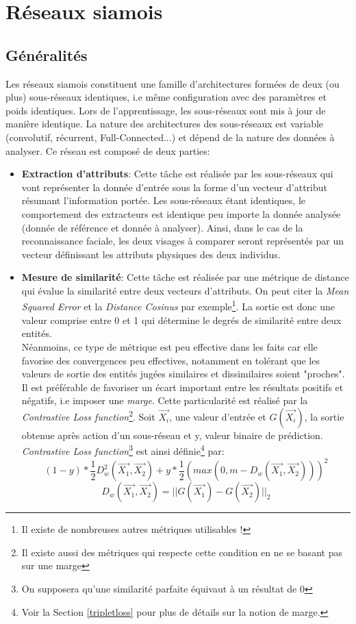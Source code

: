 \section{Réseaux siamois}
\subsection{Généralités}
Les réseaux siamois\cite{siamese} constituent une famille d'architectures formées de deux (ou plus) sous-réseaux identiques, i.e même configuration avec des paramètres et poids identiques. Lors de l'apprentissage, les sous-réseaux sont mis à jour de manière identique. La nature des architectures des sous-réseaux est variable (convolutif, récurrent, Full-Connected...) et dépend de la nature des données à analyser. Ce réseau est composé de deux parties:
\begin{itemize}
    \item \textbf{Extraction d'attributs}: Cette tâche est réalisée par les sous-réseaux qui vont représenter la donnée d'entrée sous la forme d'un vecteur d'attribut résumant l'information portée. Les sous-réseaux étant identiques, le comportement des extracteurs est identique peu importe la donnée analysée (donnée de référence et donnée à analyser). Ainsi, dans le cas de la reconnaissance faciale, les deux visages à comparer seront représentés par un vecteur définissant les attributs physiques des deux individus.
    \item \textbf{Mesure de similarité}: Cette tâche est réalisée par une métrique de distance qui évalue la similarité entre deux vecteurs d'attributs. On peut citer la \textit{Mean Squared Error} et la \textit{Distance Cosinus} par exemple\footnote{Il existe de nombreuses autres métriques utilisables !}. La sortie est donc une valeur comprise entre 0 et 1 qui détermine le degrés de similarité entre deux entités.\\

    Néanmoins, ce type de métrique est peu effective dans les faits car elle favorise des convergences peu effectives, notamment en tolérant que les valeurs de sortie des entités jugées similaires et dissimilaires soient "proches". Il est préférable de favoriser un écart important entre les résultats positifs et négatifs, i.e imposer une \textit{marge}. Cette particularité est réalisé par la \textit{Contrastive Loss function}\cite{contlossfn}\footnote{Il existe aussi des métriques qui respecte cette condition en ne se basant pas sur une marge}. Soit $\vec{X_i}$, une valeur d'entrée et $G(\vec{X_i})$, la sortie obtenue après action d'un sous-réseau et y, valeur binaire de prédiction. \textit{Contrastive Loss function}\footnote{On supposera qu'une similarité parfaite équivaut à un résultat de 0} est ainsi définie\footnote{Voir la Section \ref{tripletloss} pour plus de détails sur la notion de marge.} par:
    $$(1-y)*\frac{1}{2}D_w^2(\vec{X_1},\vec{X_2})+y*\frac{1}{2}(max(0, m-D_w(\vec{X_1},\vec{X_2})))^2$$
    $$D_w(\vec{X_1},\vec{X_2})=||G(\vec{X_1})-G(\vec{X_2})||_2$$
\end{itemize}

